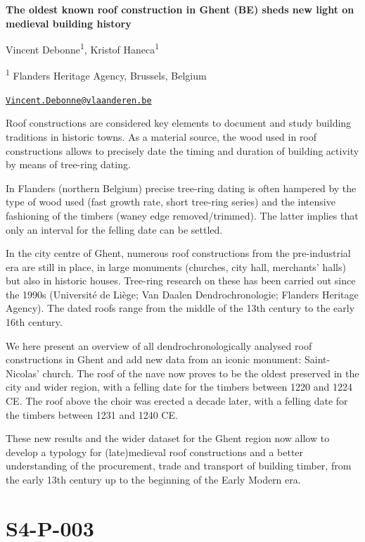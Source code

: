 \documentclass[
]{book}
\begin{document}
\textbf{The oldest known roof construction in Ghent (BE) sheds new light on medieval building history}

Vincent Debonne\textsuperscript{1}, Kristof Haneca\textsuperscript{1}

\textsuperscript{1} Flanders Heritage Agency, Brussels, Belgium

\href{mailto:Vincent.Debonne@vlaanderen.be}{\nolinkurl{Vincent.Debonne@vlaanderen.be}}

Roof constructions are considered key elements to document and study building traditions in historic towns. As a material source, the wood used in roof constructions allows to precisely date the timing and duration of building activity by means of tree-ring dating.

In Flanders (northern Belgium) precise tree-ring dating is often hampered by the type of wood used (fast growth rate, short tree-ring series) and the intensive fashioning of the timbers (waney edge removed/trimmed). The latter implies that only an interval for the felling date can be settled.

In the city centre of Ghent, numerous roof constructions from the pre-industrial era are still in place, in large monuments (churches, city hall, merchants' halls) but also in historic houses. Tree-ring research on these has been carried out since the 1990s (Université de Liège; Van Daalen Dendrochronologie; Flanders Heritage Agency). The dated roofs range from the middle of the 13th century to the early 16th century.

We here present an overview of all dendrochronologically analysed roof constructions in Ghent and add new data from an iconic monument: Saint-Nicolas' church. The roof of the nave now proves to be the oldest preserved in the city and wider region, with a felling date for the timbers between 1220 and 1224 CE. The roof above the choir was erected a decade later, with a felling date for the timbers between 1231 and 1240 CE.

These new results and the wider dataset for the Ghent region now allow to develop a typology for (late)medieval roof constructions and a better understanding of the procurement, trade and transport of building timber, from the early 13th century up to the beginning of the Early Modern era.

\hypertarget{s4-p-003}{%
\section*{S4-P-003}\label{s4-p-003}}
\end{document}

